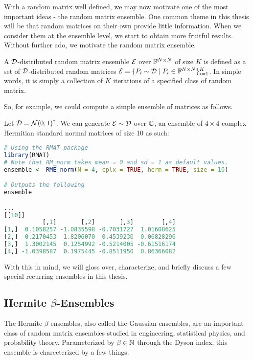 With a random matrix well defined, we may now motivate one of the most important ideas - the random matrix ensemble. One common theme in this thesis will be that random matrices on their own provide little information. When we consider them at the ensemble level, we start to obtain more fruitful results. Without further ado, we motivate the random matrix ensemble.

\begin{definition}
A $\mathcal{D}$-distributed random matrix ensemble $\mathcal{E}$ over $\mathbb{F}^{N \times N}$ of size $K$ is defined as a set of $\mathcal{D}$-distributed random matrices $\mathcal{E} = \{P_i \sim \mathcal{D} \mid P_i \in \mathbb{F}^{N \times N}\}_{i = 1}^K$. In simple words, it is simply a collection of $K$ iterations of a specified class of random matrix.
\end{definition}

So, for example, we could compute a simple ensemble of matrices as follows.

\begin{code}
Let $\mathcal{D} = \mathcal{N}(0,1)^{\dagger}$. We can generate $\mathcal{E} \sim \mathcal{D}$ over $\mathbb{C}$, an ensemble of $4 \times 4$ complex Hermitian standard normal matrices of size 10 as such:
\end{code}

\begin{lstlisting}[language=R]
# Using the RMAT package
library(RMAT)
# Note that RM_norm takes mean = 0 and sd = 1 as default values.
ensemble <- RME_norm(N = 4, cplx = TRUE, herm = TRUE, size = 10)

# Outputs the following
ensemble

...
[[10]]
           [,1]       [,2]       [,3]        [,4]
[1,]  0.1058257 -1.0835598 -0.7031727  1.01608625
[2,] -0.2170453  1.8206070 -0.4539230  0.06828296
[3,]  1.3002145  0.1254992 -0.5214005 -0.61516174
[4,] -1.0398587  0.1975445 -0.8511950  0.86366082
\end{lstlisting}

With this in mind, we will gloss over, characterize, and briefly discuss a few special recurring ensembles in this thesis.

\subsection{Hermite $\beta$-Ensembles}

The Hermite $\beta$-ensembles, also called the Gaussian ensembles, are an important class of random matrix ensembles studied in engineering, statistical physics, and probability theory. Parameterized by $\beta \in \mathbb{N}$ through the Dyson index, this ensemble is charecterized by a few things.

